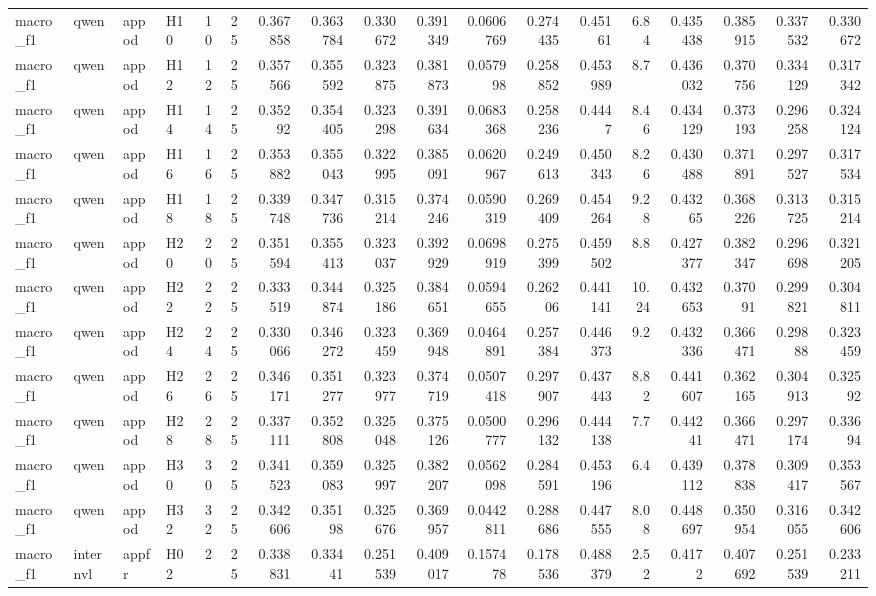 \begin{longtable}{llllrrrrrrrrrrrrrr}
macro\_f1 & qwen & appod & H10 & 10 & 25 & 0.367858 & 0.363784 & 0.330672 & 0.391349 & 0.0606769 & 0.274435 & 0.45161 & 6.84 & 0.435438 & 0.385915 & 0.337532 & 0.330672 \\
macro\_f1 & qwen & appod & H12 & 12 & 25 & 0.357566 & 0.355592 & 0.323875 & 0.381873 & 0.057998 & 0.258852 & 0.453989 & 8.7 & 0.436032 & 0.370756 & 0.334129 & 0.317342 \\
macro\_f1 & qwen & appod & H14 & 14 & 25 & 0.35292 & 0.354405 & 0.323298 & 0.391634 & 0.0683368 & 0.258236 & 0.4447 & 8.46 & 0.434129 & 0.373193 & 0.296258 & 0.324124 \\
macro\_f1 & qwen & appod & H16 & 16 & 25 & 0.353882 & 0.355043 & 0.322995 & 0.385091 & 0.0620967 & 0.249613 & 0.450343 & 8.26 & 0.430488 & 0.371891 & 0.297527 & 0.317534 \\
macro\_f1 & qwen & appod & H18 & 18 & 25 & 0.339748 & 0.347736 & 0.315214 & 0.374246 & 0.0590319 & 0.269409 & 0.454264 & 9.28 & 0.43265 & 0.368226 & 0.313725 & 0.315214 \\
macro\_f1 & qwen & appod & H20 & 20 & 25 & 0.351594 & 0.355413 & 0.323037 & 0.392929 & 0.0698919 & 0.275399 & 0.459502 & 8.8 & 0.427377 & 0.382347 & 0.296698 & 0.321205 \\
macro\_f1 & qwen & appod & H22 & 22 & 25 & 0.333519 & 0.344874 & 0.325186 & 0.384651 & 0.0594655 & 0.26206 & 0.441141 & 10.24 & 0.432653 & 0.37091 & 0.299821 & 0.304811 \\
macro\_f1 & qwen & appod & H24 & 24 & 25 & 0.330066 & 0.346272 & 0.323459 & 0.369948 & 0.0464891 & 0.257384 & 0.446373 & 9.2 & 0.432336 & 0.366471 & 0.29888 & 0.323459 \\
macro\_f1 & qwen & appod & H26 & 26 & 25 & 0.346171 & 0.351277 & 0.323977 & 0.374719 & 0.0507418 & 0.297907 & 0.437443 & 8.82 & 0.441607 & 0.362165 & 0.304913 & 0.32592 \\
macro\_f1 & qwen & appod & H28 & 28 & 25 & 0.337111 & 0.352808 & 0.325048 & 0.375126 & 0.0500777 & 0.296132 & 0.444138 & 7.7 & 0.44241 & 0.366471 & 0.297174 & 0.33694 \\
macro\_f1 & qwen & appod & H30 & 30 & 25 & 0.341523 & 0.359083 & 0.325997 & 0.382207 & 0.0562098 & 0.284591 & 0.453196 & 6.4 & 0.439112 & 0.378838 & 0.309417 & 0.353567 \\
macro\_f1 & qwen & appod & H32 & 32 & 25 & 0.342606 & 0.35198 & 0.325676 & 0.369957 & 0.0442811 & 0.288686 & 0.447555 & 8.08 & 0.448697 & 0.350954 & 0.316055 & 0.342606 \\
macro\_f1 & internvl & appfr & H02 & 2 & 25 & 0.338831 & 0.33441 & 0.251539 & 0.409017 & 0.157478 & 0.178536 & 0.488379 & 2.52 & 0.4172 & 0.407692 & 0.251539 & 0.233211 \\

\end{longtable}
